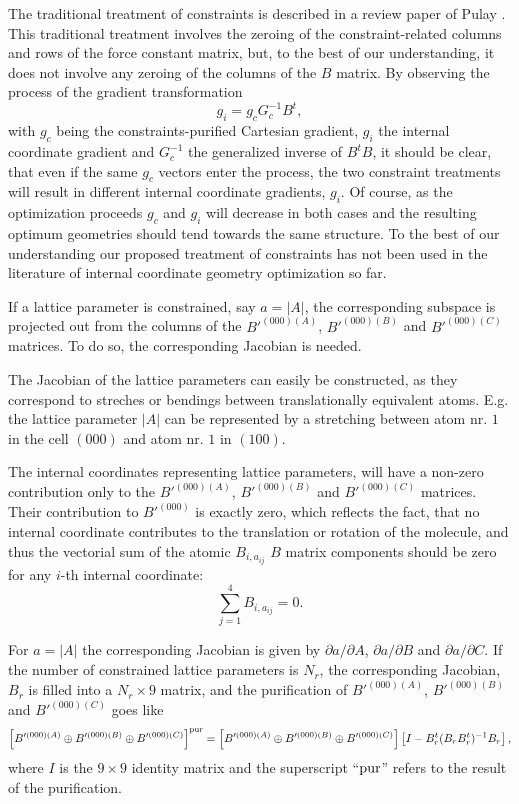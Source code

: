\documentclass[prl,aps,preprint,superbib,12pt]{revtex4}
\begin{document}
The traditional treatment of constraints is described in a review
paper of Pulay \cite{PPulay77}. This traditional treatment
involves the zeroing of the constraint-related columns and rows of the
force constant matrix, but, to the best of our understanding,
it does not involve any zeroing of the columns of the $B$ matrix.
By observing the process of the gradient transformation 
\begin{equation}
g_{i} = g_{c} G_{c}^{-1} B^{t},
\end{equation}
with $g_{c}$ being the constraints-purified Cartesian gradient,
$g_{i}$ the internal coordinate gradient and $G_{c}^{-1}$ 
the generalized inverse of $B^{t}B$, it should be clear,
that even if the same $g_{c}$ vectors enter the process, the two
constraint treatments will result in different internal coordinate 
gradients, $g_{i}$.
Of course, as the optimization proceeds $g_{c}$ and $g_{i}$ will
decrease in both cases and the resulting optimum geometries
should tend towards the same structure.
To the best of our understanding our proposed treatment of constraints
has not been used in the literature of internal coordinate
geometry optimization so far.

If a lattice parameter is constrained, say 
$a=|A|$, the corresponding subspace is projected out from the
columns of the $B'^{(000)(A)}$, $B'^{(000)(B)}$ and $B'^{(000)(C)}$
matrices. To do so, the corresponding Jacobian is needed.

The Jacobian of the lattice parameters can easily be constructed,
as they correspond to streches or bendings between translationally
equivalent atoms. E.g. the lattice parameter $|A|$ can be represented
by a stretching between atom nr. $1$ in the cell $(000)$ and 
atom nr. $1$ in $(100)$. 

The internal coordinates representing
lattice parameters, will have
a non-zero contribution only to the 
$B'^{(000)(A)}$, $B'^{(000)(B)}$ and $B'^{(000)(C)}$
 matrices. Their contribution to $B'^{(000)}$
is exactly zero, which reflects the fact, that no internal
coordinate contributes to the translation or rotation of the
molecule, and thus the vectorial sum of the atomic $B_{i,a_{ij}}$ 
$B$ matrix components should be zero for any $i$-th internal coordinate:
\begin{equation}
\sum_{j=1}^{4} B_{i,a_{ij}} = 0 .
\end{equation}

For $a=|A|$ the corresponding Jacobian is given by 
$\partial a / \partial A$, $\partial a / \partial B$ 
and $\partial a / \partial C$.
If the number of constrained lattice parameters is $N_{r}$,
the corresponding Jacobian, $B_{r}$ is filled into a 
$N_{r} \times 9$ matrix, and the purification of 
$B'^{(000)(A)}$, $B'^{(000)(B)}$ and $B'^{(000)(C)}$
goes like
\begin{equation}
\left[ B'^{(000)(A)} \oplus B'^{(000)(B)} \oplus B'^{(000)(C)} \right]^{\rm pur} =
\left[ B'^{(000)(A)} \oplus B'^{(000)(B)} \oplus B'^{(000)(C)} \right]
\left[ I-B_{r}^{t}(B_{r}B_{r}^{t})^{-1}B_{r} \right] ,
\end{equation}
where $I$ is the $9 \times 9$ identity matrix and the superscript  
``${\rm pur}$'' refers to the result of the purification.
\end{document}
